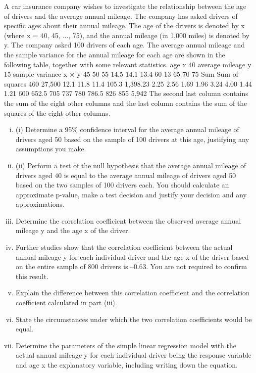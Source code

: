 \documentclass[a4paper,12pt]{article}
\begin{document}

A car insurance company wishes to investigate the relationship between the age of drivers and the average annual mileage. The company has asked drivers of specific ages about their annual mileage. The age of the drivers is denoted by x (where x = 40,
45, ..., 75), and the annual mileage (in 1,000 miles) is denoted by y. The company asked 100 drivers of each age.
The average annual mileage and the sample variance for the annual mileage for each age are shown in the following table, together with some relevant statistics.
age x 40
average mileage y 15
sample variance
x × y
45
50
55
14.5 14.1 13.4
60
13
65
70
75
Sum Sum of squares
460 27,500
12.1 11.8 11.4 105.3
1,398.23
2.25 2.56 1.69 1.96 3.24 4.00 1.44 1.21
600 652.5 705
737
780 786.5 826
855 5,942
The second last column contains the sum of the eight other columns and the last
column contains the sum of the squares of the eight other columns.

\begin{enumerate}[(i)]
\item (i) Determine a 95\%  confidence interval for the average annual mileage of
drivers aged 50 based on the sample of 100 drivers at this age, justifying any
assumptions you make.


\item (ii) Perform a test of the null hypothesis that the average annual mileage of drivers aged 40 is equal to the average annual mileage of drivers aged 50 based on the two samples of 100 drivers each. You should calculate an approximate
p-value, make a test decision and justify your decision and any
approximations.
\item 
Determine the correlation coefficient between the observed average annual
mileage y and the age x of the driver.
\item 

Further studies show that the correlation coefficient between the actual annual mileage
y for each individual driver and the age x of the driver based on the entire sample of 800 drivers is –0.63. You are not required to confirm this result.
\item 
Explain the difference between this correlation coefficient and the correlation coefficient calculated in part (iii). 
\item 

State the circumstances under which the two correlation coefficients would be equal.
\item 
Determine the parameters of the simple linear regression model with the actual annual mileage y for each individual driver being the response variable and age x the explanatory variable, including writing down the equation. 
\end{enumerate}



\end{document}
